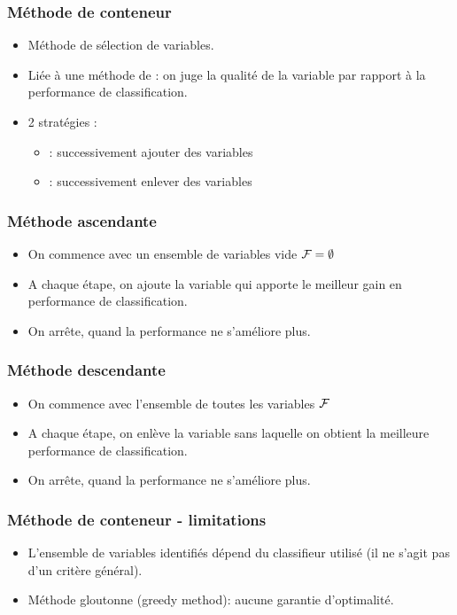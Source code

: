 \begin{frame}
  \frametitle{Méthode de conteneur}
  \begin{itemize}
  	\item Méthode  de sélection de variables. 
  	\item Liée à une méthode de  : on juge la qualité de la variable par rapport à la performance de classification.
  	\item 2 stratégies : 
  	\begin{itemize}
  		\item {}: successivement ajouter des variables
  		\item {}: successivement enlever des variables
  	\end{itemize}
  \end{itemize}
\end{frame}

\begin{frame}
  \frametitle{Méthode ascendante}
  \begin{itemize}
  	\item On commence avec un ensemble de variables vide $\mathcal{F} = \emptyset$
  	\item A chaque étape, on ajoute la variable qui apporte le meilleur gain en performance de classification.
  	\item On arrête, quand la performance ne s'améliore plus. 
  \end{itemize}
\end{frame}

\begin{frame}
  \frametitle{Méthode descendante}
  \begin{itemize}
  	\item On commence avec l'ensemble de toutes les variables $\mathcal{F}$
  	\item A chaque étape, on enlève la variable sans laquelle on obtient la meilleure performance de classification.
  	\item On arrête, quand la performance ne s'améliore plus. 
  \end{itemize}
\end{frame}

\begin{frame}
  \frametitle{Méthode de conteneur - limitations}
  \begin{itemize}
  	\item L'ensemble de variables identifiés dépend du classifieur utilisé (il ne s'agit pas d'un critère général). 
  	\item Méthode gloutonne (greedy method): aucune garantie d'optimalité. 
  \end{itemize}
\end{frame}

